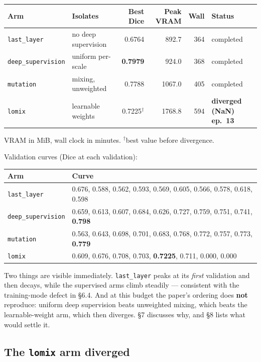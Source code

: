 \documentclass[11pt,a4paper]{article}
\newcommand{\code}[1]{\texttt{\small #1}}
\begin{document}
\begin{center}
\begin{tabular}{@{}llrrrl@{}}
\toprule
\textbf{Arm} & \textbf{Isolates} & \textbf{Best Dice} & \textbf{Peak VRAM} &
\textbf{Wall} & \textbf{Status} \\
\midrule
\code{last\_layer} & no deep supervision & 0.6764 & 892.7 & 364 & completed \\
\code{deep\_supervision} & uniform per-scale & \textbf{0.7979} & 924.0 & 368 & completed \\
\code{mutation} & mixing, unweighted & 0.7788 & 1067.0 & 405 & completed \\
\code{lomix} & learnable weights & 0.7225$^\dagger$ & 1768.8 & 594 & \textbf{diverged (NaN) ep.\ 13} \\
\bottomrule
\end{tabular}
\end{center}
{\small VRAM in MiB, wall clock in minutes. $^\dagger$best value before divergence.}

Validation curves (Dice at each validation):

\begin{center}
\begin{tabular}{@{}lp{11.3cm}@{}}
\toprule
\textbf{Arm} & \textbf{Curve} \\
\midrule
\code{last\_layer} & 0.676, 0.588, 0.562, 0.593, 0.569, 0.605, 0.566, 0.578, 0.618, 0.598 \\
\code{deep\_supervision} & 0.659, 0.613, 0.607, 0.684, 0.626, 0.727, 0.759, 0.751, 0.741, \textbf{0.798} \\
\code{mutation} & 0.563, 0.643, 0.698, 0.701, 0.683, 0.768, 0.772, 0.757, 0.773, \textbf{0.779} \\
\code{lomix} & 0.609, 0.676, 0.708, 0.703, \textbf{0.7225}, 0.711, 0.000, 0.000 \\
\bottomrule
\end{tabular}
\end{center}

Two things are visible immediately. \code{last\_layer} peaks at its \emph{first}
validation and then decays, while the supervised arms climb steadily ---
consistent with the training-mode defect in \S6.4. And at this budget the
paper's ordering does \textbf{not} reproduce: uniform deep supervision beats
unweighted mixing, which beats the learnable-weight arm, which then diverges.
\S7 discusses why, and \S8 lists what would settle it.

\subsection{The \code{lomix} arm diverged}
\end{document}
